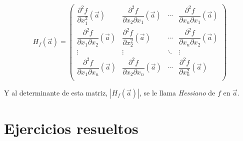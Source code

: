 \[
\renewcommand{\arraystretch}{2.2}
H_f(\vec a)=\left(
\begin{array}{cccc}
 \dfrac{\partial^2 f}{\partial x_1^2}( \vec a)  & \dfrac{\partial^2 f}{\partial x_2\partial x_1}(\vec a) & \cdots & \dfrac{\partial^2 f}{\partial x_n\partial x_1}(\vec a) \\
 \dfrac{\partial^2 f}{\partial x_1\partial x_2}(\vec a) & \dfrac{\partial^2 f}{\partial x_2^2}(\vec a)  & \cdots & \dfrac{\partial^2 f}{\partial x_n\partial x_2}(\vec a) \\
                 \vdots                  &                 \vdots                  & \ddots &                 \vdots                  \\
 \dfrac{\partial^2 f}{\partial x_1\partial x_n}(\vec a) & \dfrac{\partial^2 f}{\partial x_2\partial x_n}(\vec a) & \cdots & \dfrac{\partial^2 f}{\partial x_n^2}(\vec a)  \\
\end{array}
\right)
\]

Y al determinante de esta matriz, $\left| {H_f \left( {\vec a}
\right)} \right|$, se le llama \emph{Hessiano} de $f$ en $\vec a$.

\newpage

\section{Ejercicios resueltos}


